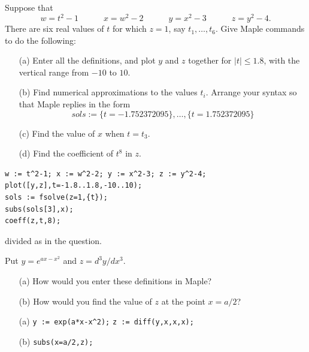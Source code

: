 \documentclass[a4paper]{article}
\begin{document}
\begin{problem}
 Suppose that 
 \[ w=t^2-1 \hspace{3em}
    x=w^2-2 \hspace{3em}
    y=x^2-3 \hspace{3em}
    z=y^2-4.
 \]
 There are six real values of $t$ for which $z=1$, say
 $t_1,\dotsc,t_6$.  Give Maple commands to do the following:
 \begin{itemize}
  \item[(a)] Enter all the definitions, and plot $y$ and $z$ together
   for $|t|\leq 1.8$, with the vertical range from $-10$ to $10$.  
  \item[(b)] Find numerical approximations to the values $t_i$.
   Arrange your syntax so that Maple replies in the form 
   \[ sols := \{t = -1.752372095\}, \dotsc , \{t = 1.752372095\} \]
  \item[(c)] Find the value of $x$ when $t=t_3$. 
  \item[(d)] Find the coefficient of $t^8$ in $z$. 
 \end{itemize}
\end{problem}
\begin{solution}
 \begin{verbatim}
w := t^2-1; x := w^2-2; y := x^2-3; z := y^2-4;
plot([y,z],t=-1.8..1.8,-10..10);
sols := fsolve(z=1,{t});
subs(sols[3],x);
coeff(z,t,8);
 \end{verbatim}
  divided as in the question.
\end{solution}

\begin{problem}
 Put $y=e^{ax-x^2}$ and $z=d^3y/dx^3$.
 \begin{itemize}
  \item[(a)] How would you enter these definitions in Maple? 
  \item[(b)] How would you find the value of $z$ at the point $x=a/2$? 
 \end{itemize}
\end{problem}
\begin{solution}
 \begin{itemize}
  \item[(a)] \verb~y := exp(a*x-x^2);~ \mk
             \verb~z := diff(y,x,x,x);~ 
  \item[(b)] \verb~subs(x=a/2,z);~ \mk
 \end{itemize}
\end{solution}
\end{document}
